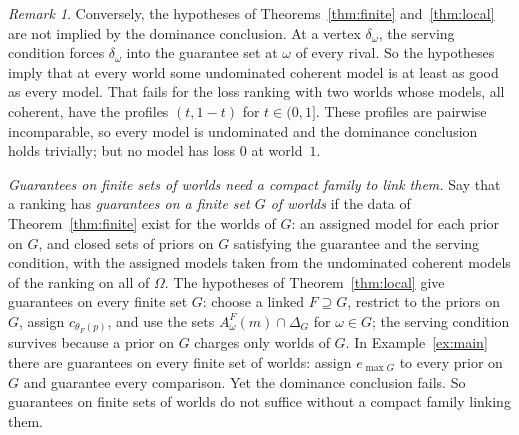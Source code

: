 \documentclass[11pt]{article}
\theoremstyle{definition}
\theoremstyle{remark}
\newtheorem{remark}[theorem]{Remark}
\begin{document}
\begin{remark}\label{rem:vertex}
Conversely, the hypotheses of Theorems~\ref{thm:finite} and~\ref{thm:local} are not implied by the dominance conclusion. At a vertex $\delta_\omega$, the serving condition forces $\delta_\omega$ into the guarantee set at $\omega$ of every rival. So the hypotheses imply that at every world some undominated coherent model is at least as good as every model. That fails for the loss ranking with two worlds whose models, all coherent, have the profiles $(t,1-t)$ for $t\in(0,1]$. These profiles are pairwise incomparable, so every model is undominated and the dominance conclusion holds trivially; but no model has loss $0$ at world~$1$.
\end{remark}

\emph{Guarantees on finite sets of worlds need a compact family to link them.} Say that a ranking has \emph{guarantees on a finite set $G$ of worlds} if the data of Theorem~\ref{thm:finite} exist for the worlds of $G$: an assigned model for each prior on $G$, and closed sets of priors on $G$ satisfying the guarantee and the serving condition, with the assigned models taken from the undominated coherent models of the ranking on all of $\Omega$. The hypotheses of Theorem~\ref{thm:local} give guarantees on every finite set $G$: choose a linked $F\supseteq G$, restrict to the priors on $G$, assign $c_{\theta_F(p)}$, and use the sets $A^F_\omega(m)\cap\Delta_G$ for $\omega\in G$; the serving condition survives because a prior on $G$ charges only worlds of $G$. In Example~\ref{ex:main} there are guarantees on every finite set of worlds: assign $e_{\max G}$ to every prior on $G$ and guarantee every comparison. Yet the dominance conclusion fails. So guarantees on finite sets of worlds do not suffice without a compact family linking them.
\end{document}
